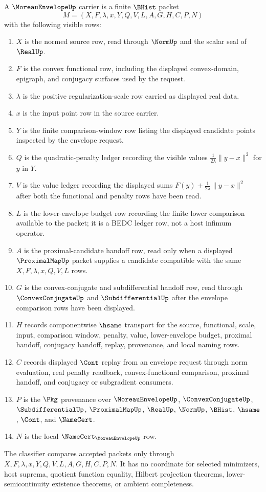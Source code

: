 \begin{definition}
\label{def:moreau-envelope-carrier}
A $\MoreauEnvelopeUp$ carrier is a finite $\BHist$ packet
$$
M=(X,F,\lambda,x,Y,Q,V,L,A,G,H,C,P,N)
$$
with the following visible rows:
\begin{enumerate}
\item $X$ is the normed source row, read through $\NormUp$ and the scalar seal of $\RealUp$.
\item $F$ is the convex functional row, including the displayed convex-domain, epigraph, and conjugacy surfaces used by the request.
\item $\lambda$ is the positive regularization-scale row carried as displayed real data.
\item $x$ is the input point row in the source carrier.
\item $Y$ is the finite comparison-window row listing the displayed candidate points inspected by the envelope request.
\item $Q$ is the quadratic-penalty ledger recording the visible values $\frac{1}{2\lambda}\lVert y-x\rVert^2$ for $y$ in $Y$.
\item $V$ is the value ledger recording the displayed sums $F(y)+\frac{1}{2\lambda}\lVert y-x\rVert^2$ after both the functional and penalty rows have been read.
\item $L$ is the lower-envelope budget row recording the finite lower comparison available to the packet; it is a BEDC ledger row, not a host infimum operator.
\item $A$ is the proximal-candidate handoff row, read only when a displayed $\ProximalMapUp$ packet supplies a candidate compatible with the same $X,F,\lambda,x,Q,V,L$ rows.
\item $G$ is the convex-conjugate and subdifferential handoff row, read through $\ConvexConjugateUp$ and $\SubdifferentialUp$ after the envelope comparison rows have been displayed.
\item $H$ records componentwise $\hsame$ transport for the source, functional, scale, input, comparison window, penalty, value, lower-envelope budget, proximal handoff, conjugacy handoff, replay, provenance, and local naming rows.
\item $C$ records displayed $\Cont$ replay from an envelope request through norm evaluation, real penalty readback, convex-functional comparison, proximal handoff, and conjugacy or subgradient consumers.
\item $P$ is the $\Pkg$ provenance over $\MoreauEnvelopeUp$, $\ConvexConjugateUp$, $\SubdifferentialUp$, $\ProximalMapUp$, $\RealUp$, $\NormUp$, $\BHist$, $\hsame$, $\Cont$, and $\NameCert$.
\item $N$ is the local $\NameCert_{\MoreauEnvelopeUp}$ row.
\end{enumerate}
The classifier compares accepted packets only through $X,F,\lambda,x,Y,Q,V,L,A,G,H,C,P,N$. It has no coordinate for selected minimizers, host suprema, quotient function equality, Hilbert projection theorems, lower-semicontinuity existence theorems, or ambient completeness.
\end{definition}

